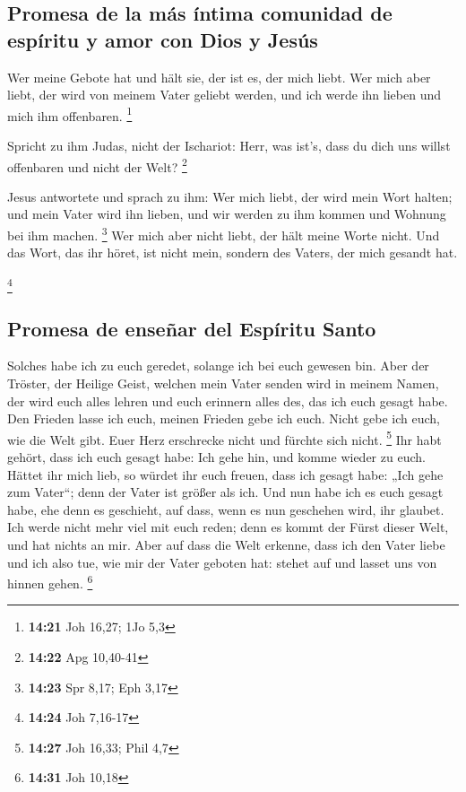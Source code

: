 \hypertarget{promesa-de-la-muxe1s-uxedntima-comunidad-de-espuxedritu-y-amor-con-dios-y-jesuxfas}{%
\subsection{Promesa de la más íntima comunidad de espíritu y amor con
Dios y
Jesús}\label{promesa-de-la-muxe1s-uxedntima-comunidad-de-espuxedritu-y-amor-con-dios-y-jesuxfas}}

 Wer meine Gebote hat und hält sie, der ist es, der mich
liebt. Wer mich aber liebt, der wird von meinem Vater geliebt werden,
und ich werde ihn lieben und mich ihm offenbaren. \footnote{\textbf{14:21}
  Joh 16,27; 1Jo 5,3}

 Spricht zu ihm Judas, nicht der Ischariot: Herr, was
ist's, dass du dich uns willst offenbaren und nicht der Welt?
\footnote{\textbf{14:22} Apg 10,40-41}

 Jesus antwortete und sprach zu ihm: Wer mich liebt, der
wird mein Wort halten; und mein Vater wird ihn lieben, und wir werden zu
ihm kommen und Wohnung bei ihm machen. \footnote{\textbf{14:23} Spr
  8,17; Eph 3,17}  Wer mich aber nicht liebt, der hält
meine Worte nicht. Und das Wort, das ihr höret, ist nicht mein, sondern
des Vaters, der mich gesandt hat.

\footnote{\textbf{14:24} Joh 7,16-17}

\hypertarget{promesa-de-enseuxf1ar-del-espuxedritu-santo}{%
\subsection{Promesa de enseñar del Espíritu
Santo}\label{promesa-de-enseuxf1ar-del-espuxedritu-santo}}

 Solches habe ich zu euch geredet, solange ich bei euch
gewesen bin.  Aber der Tröster, der Heilige Geist,
welchen mein Vater senden wird in meinem Namen, der wird euch alles
lehren und euch erinnern alles des, das ich euch gesagt habe.
 Den Frieden lasse ich euch, meinen Frieden gebe ich
euch. Nicht gebe ich euch, wie die Welt gibt. Euer Herz erschrecke nicht
und fürchte sich nicht. \footnote{\textbf{14:27} Joh 16,33; Phil 4,7}
 Ihr habt gehört, dass ich euch gesagt habe: Ich gehe
hin, und komme wieder zu euch. Hättet ihr mich lieb, so würdet ihr euch
freuen, dass ich gesagt habe: „Ich gehe zum Vater``; denn der Vater ist
größer als ich.  Und nun habe ich es euch gesagt habe,
ehe denn es geschieht, auf dass, wenn es nun geschehen wird, ihr
glaubet.  Ich werde nicht mehr viel mit euch reden; denn
es kommt der Fürst dieser Welt, und hat nichts an mir. 
Aber auf dass die Welt erkenne, dass ich den Vater liebe und ich also
tue, wie mir der Vater geboten hat: stehet auf und lasset uns von hinnen
gehen. \footnote{\textbf{14:31} Joh 10,18}

